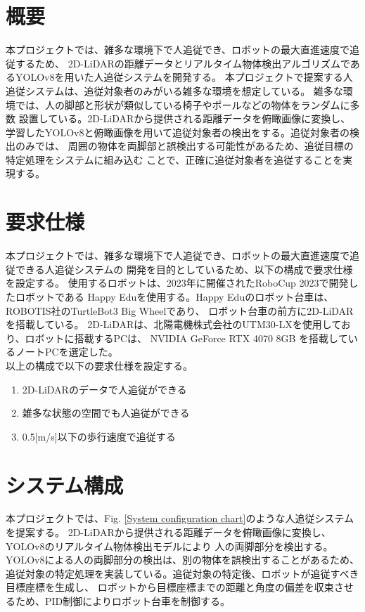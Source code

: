 \section{概要}
本プロジェクトでは、雑多な環境下で人追従でき、ロボットの最大直進速度で追従するため、
2D-LiDARの距離データとリアルタイム物体検出アルゴリズムであるYOLOv8を用いた人追従システムを開発する。
本プロジェクトで提案する人追従システムは、追従対象者のみがいる雑多な環境を想定している。
雑多な環境では、人の脚部と形状が類似している椅子やポールなどの物体をランダムに多数
設置している。2D-LiDARから提供される距離データを俯瞰画像に変換し、
学習したYOLOv8と俯瞰画像を用いて追従対象者の検出をする。追従対象者の検出のみでは、
周囲の物体を両脚部と誤検出する可能性があるため、追従目標の特定処理をシステムに組み込む
ことで、正確に追従対象者を追従することを実現する。

\section{要求仕様}
本プロジェクトでは、雑多な環境下で人追従でき、ロボットの最大直進速度で追従できる人追従システムの
開発を目的としているため、以下の構成で要求仕様を設定する。
使用するロボットは、2023年に開催されたRoboCup 2023で開発したロボットである
Happy Eduを使用する。Happy Eduのロボット台車は、ROBOTIS社のTurtleBot3 Big Wheelであり、
ロボット台車の前方に2D-LiDARを搭載している。
2D-LiDARは、北陽電機株式会社のUTM30-LXを使用しており、ロボットに搭載するPCは、
NVIDIA GeForce RTX 4070 8GB を搭載しているノートPCを選定した。\\ \indent
以上の構成で以下の要求仕様を設定する。\\

\begin{enumerate}
\item 2D-LiDARのデータで人追従ができる \\
\item 雑多な状態の空間でも人追従ができる \\
\item 0.5[m/s]以下の歩行速度で追従する \\
\end{enumerate}

\section{システム構成}
本プロジェクトでは、Fig. \ref{System configuration chart}のような人追従システムを提案する。
2D-LiDARから提供される距離データを俯瞰画像に変換し、YOLOv8のリアルタイム物体検出モデルにより
人の両脚部分を検出する。YOLOv8による人の両脚部分の検出は、別の物体を誤検出することがあるため、
追従対象の特定処理を実装している。追従対象の特定後、ロボットが追従すべき目標座標を生成し、
ロボットから目標座標までの距離と角度の偏差を収束させるため、PID制御によりロボット台車を制御する。

